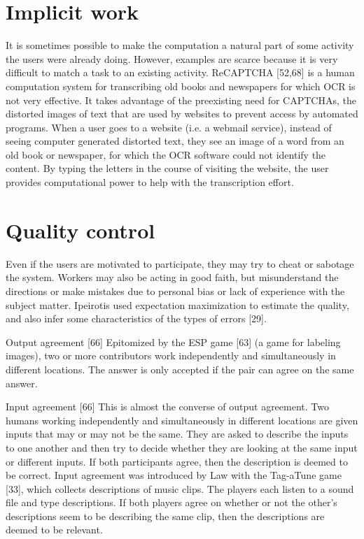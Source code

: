 \documentclass{acm_proc_article-sp} %
\begin{document}
\section{Implicit work} It is sometimes possible to make the computation a natural part of some activity the users were already doing. However, examples are scarce because it is very difficult to match a task to an existing activity. ReCAPTCHA [52,68] is a human computation system for transcribing old books and newspapers for which OCR is not very effective. It takes advantage of the preexisting need for CAPTCHAs, the distorted images of text that are used by websites to prevent access by automated programs. When a user goes to a website (i.e. a webmail service), instead of seeing computer generated distorted text, they see an image of a word from an old book or newspaper, for which the OCR software could not identify the content. By typing the letters in the course of visiting the website, the user provides computational power to help with the transcription effort.

\section{Quality control} Even if the users are motivated to participate, they may try to cheat or sabotage the system. Workers may also be acting in good faith, but misunderstand the directions or make mistakes due to personal bias or lack of experience with the subject matter. Ipeirotis used expectation maximization to estimate the quality, and also infer some characteristics of the types of errors [29].

Output agreement [66] Epitomized by the ESP game [63] (a game for labeling images), two or more contributors work independently and simultaneously in different locations.  The answer is only accepted if the pair can agree on the same answer. 

Input agreement [66] This is almost the converse of output agreement. Two humans working independently and simultaneously in different locations are given inputs that may or may not be the same. They are asked to describe the inputs to one another and then try to decide whether they are looking at the same input or different inputs. If both participants agree, then the description is deemed to be correct. Input agreement was introduced by Law with the Tag-aTune game [33], which collects descriptions of music clips. The players each listen to a sound file and type descriptions. If both players agree on whether or not the other’s descriptions seem to be describing the same clip, then the descriptions are deemed to be relevant. 
\end{document}
